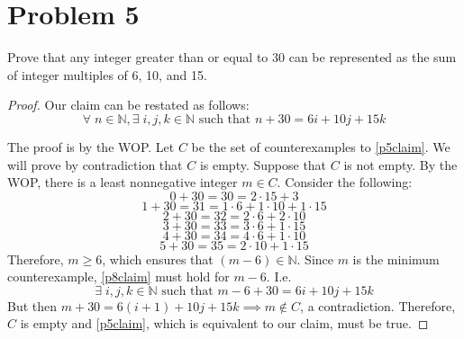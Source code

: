\documentclass{article}
\begin{document}
\pagebreak

\section{Problem 5}
Prove that any integer greater than or equal to 30 can be represented as the sum of integer multiples of 6, 10, and 15.

\begin{proof}
	Our claim can be restated as follows:
	\begin{equation}\label{p5claim}
		\forall \; n \in \mathbb{N}, \exists \; i, j, k \in \mathbb{N} \text{ such that } n + 30 = 6i + 10j + 15k
	\end{equation}

	The proof is by the WOP. Let $C$ be the set of counterexamples to \eqref{p5claim}. We will prove by contradiction that $C$ is empty. Suppose that $C$ is not empty. By the WOP, there is a least nonnegative integer $m \in C$. Consider the following:
	\[
		0 + 30 = 30 = 2 \cdot 15 + 3
	\]
	\[
		1 + 30 = 31 = 1 \cdot 6 + 1 \cdot 10 + 1 \cdot 15
	\]
	\[
		2 + 30 = 32 = 2 \cdot 6 + 2 \cdot 10
	\]
	\[
		3 + 30 = 33 = 3 \cdot 6 + 1 \cdot 15
	\]
	\[
		4 + 30 = 34 = 4 \cdot 6 + 1 \cdot 10
	\]
	\[
		5 + 30 = 35 = 2 \cdot 10 + 1 \cdot 15
	\]
	Therefore, $m \ge 6$, which ensures that $(m - 6) \in \mathbb{N}$. Since $m$ is the minimum counterexample, \eqref{p8claim} must hold for $m - 6$. I.e.
	\[
		\exists \; i, j, k \in \mathbb{N} \text{ such that } m - 6 + 30 = 6i + 10j + 15k
	\]
	But then $m + 30 = 6(i+1) + 10j + 15k \implies m \notin C$, a contradiction. Therefore, $C$ is empty and \eqref{p5claim}, which is equivalent to our claim, must be true.
\end{proof}
\end{document}
